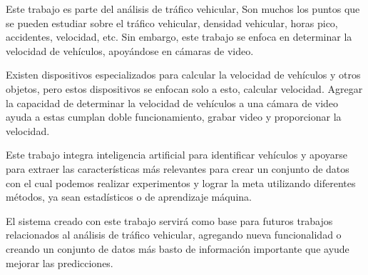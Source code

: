 

\begin{spacing}{1.5}

Este trabajo es parte del análisis de tráfico vehicular, Son muchos los puntos que se pueden estudiar sobre el tráfico vehicular, densidad vehicular, horas pico, accidentes, velocidad, etc. Sin embargo, este trabajo se enfoca en determinar la velocidad de vehículos, apoyándose en cámaras de video.

Existen dispositivos especializados para calcular la velocidad de vehículos y otros objetos, pero estos dispositivos se enfocan solo a esto, calcular velocidad. Agregar la capacidad de determinar la velocidad de vehículos a una cámara de video ayuda a estas cumplan doble funcionamiento, grabar video y proporcionar la velocidad.

Este trabajo integra inteligencia artificial para identificar vehículos y apoyarse para extraer las características más relevantes para crear un conjunto de datos con el cual podemos realizar experimentos y lograr la meta utilizando diferentes métodos, ya sean estadísticos o de aprendizaje máquina.

El sistema creado con este trabajo servirá como base para futuros trabajos relacionados al análisis de tráfico vehicular, agregando nueva funcionalidad o creando un conjunto de datos más basto de información importante que ayude mejorar las predicciones.

\end{spacing}